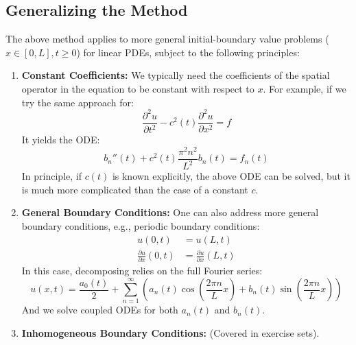 \subsection{Generalizing the Method}

\begin{remark}
The above method applies to more general initial-boundary value problems ($x \in [0,L], t \ge 0$) for linear PDEs, subject to the following principles:

\begin{enumerate}
    \item \textbf{Constant Coefficients:} We typically need the coefficients of the spatial operator in the equation to be constant with respect to $x$.
    For example, if we try the same approach for:
    \begin{equation*}
        \frac{\partial^2 u}{\partial t^2} - c^2(t) \frac{\partial^2 u}{\partial x^2} = f
    \end{equation*}
    It yields the ODE:
    \begin{equation*}
        b_n''(t) + c^2(t) \frac{\pi^2 n^2}{L^2} b_n(t) = f_n(t)
    \end{equation*}
    In principle, if $c(t)$ is known explicitly, the above ODE can be solved, but it is much more complicated than the case of a constant $c$.
    
    \item \textbf{General Boundary Conditions:} One can also address more general boundary conditions, e.g., periodic boundary conditions:
    \begin{align*}
        u(0,t) &= u(L,t) \\
        \frac{\partial u}{\partial x}(0,t) &= \frac{\partial u}{\partial x}(L,t)
    \end{align*}
    In this case, decomposing relies on the full Fourier series:
    \begin{equation*}
        u(x,t) = \frac{a_0(t)}{2} + \sum_{n=1}^{\infty} \left( a_n(t) \cos\left(\frac{2\pi n}{L}x\right) + b_n(t) \sin\left(\frac{2\pi n}{L}x\right) \right)
    \end{equation*}
    And we solve coupled ODEs for both $a_n(t)$ and $b_n(t)$.
    
    \item \textbf{Inhomogeneous Boundary Conditions:} (Covered in exercise sets).
    

\end{enumerate}
\end{remark}
